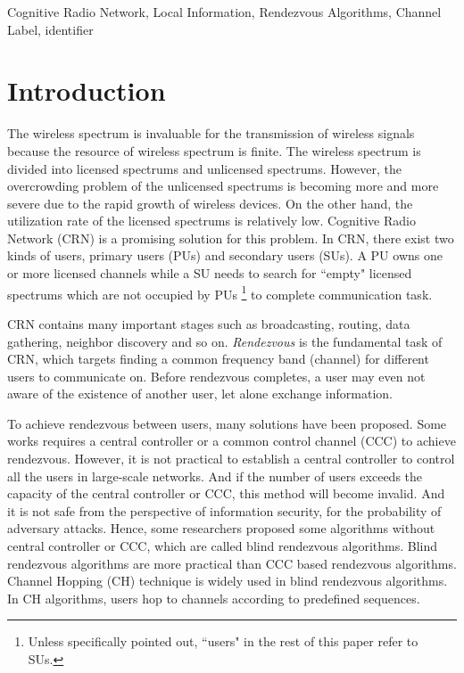 \documentclass[10pt, conference, letterpaper]{IEEEtran}
\begin{document}
\begin{IEEEkeywords}
Cognitive Radio Network, Local Information, Rendezvous Algorithms, Channel Label, identifier
\end{IEEEkeywords}

\section{Introduction}
The wireless spectrum is invaluable for the transmission of wireless signals because the resource of wireless spectrum is finite. The wireless spectrum is divided into licensed spectrums and unlicensed spectrums. However, the overcrowding problem of the unlicensed spectrums is becoming more and more severe due to the rapid growth of wireless devices. On the other hand, the utilization rate of the licensed spectrums is relatively low. Cognitive Radio Network (CRN) is a promising solution for this problem. In CRN, there exist two kinds of users, primary users (PUs) and secondary users (SUs). A PU owns one or more licensed channels while a SU needs to search for ``empty" licensed spectrums which are not occupied by PUs \footnote{Unless specifically pointed out, ``users" in the rest of this paper refer to SUs.} to complete communication task.

CRN contains many important stages such as broadcasting, routing, data gathering, neighbor discovery and so on. \emph{Rendezvous} is the fundamental task of CRN, which targets finding a common frequency band (channel) for different users to communicate on. Before rendezvous completes, a user may even not aware of the existence of another user, let alone exchange information.


To achieve rendezvous between users, many solutions have been proposed. Some works requires a central controller or a common control channel (CCC) to achieve rendezvous. However, it is not practical to establish a central controller to control all the users in large-scale networks. And if the number of users exceeds the capacity of the central controller or CCC, this method will become invalid. And it is not safe from the perspective of information security, for the probability of adversary attacks. Hence, some researchers proposed some algorithms without central controller or CCC, which are called blind rendezvous algorithms. Blind rendezvous algorithms are more practical than CCC based rendezvous algorithms. Channel Hopping (CH) technique is widely used in blind rendezvous algorithms. In CH algorithms, users hop to channels according to predefined sequences.
\end{document}
